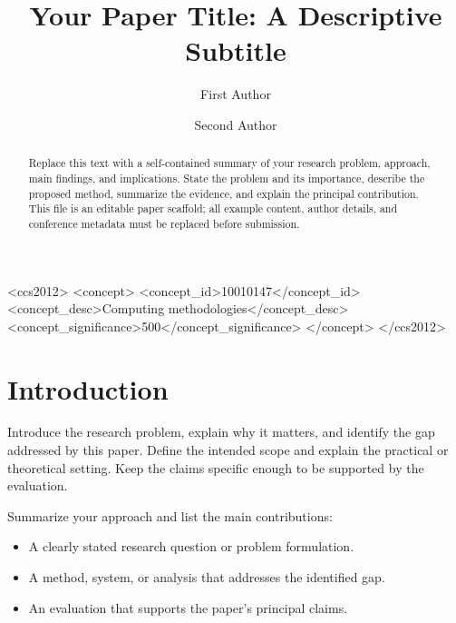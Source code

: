 \documentclass[sigconf]{acmart}
\begin{document}
\title[Short Paper Title]{Your Paper Title: A Descriptive Subtitle}

\author{First Author}

\author{Second Author}

\renewcommand{\shortauthors}{First Author and Second Author}

\begin{abstract}
Replace this text with a self-contained summary of your research problem,
approach, main findings, and implications. State the problem and its importance,
describe the proposed method, summarize the evidence, and explain the principal
contribution. This file is an editable paper scaffold; all example content,
author details, and conference metadata must be replaced before submission.
\end{abstract}

\begin{CCSXML}
<ccs2012>
 <concept>
  <concept_id>10010147</concept_id>
  <concept_desc>Computing methodologies</concept_desc>
  <concept_significance>500</concept_significance>
 </concept>
</ccs2012>
\end{CCSXML}

\maketitle

\section{Introduction}
Introduce the research problem, explain why it matters, and identify the gap
addressed by this paper. Define the intended scope and explain the practical or
theoretical setting. Keep the claims specific enough to be supported by the
evaluation.

Summarize your approach and list the main contributions:
\begin{itemize}
  \item A clearly stated research question or problem formulation.
  \item A method, system, or analysis that addresses the identified gap.
  \item An evaluation that supports the paper's principal claims.
\end{itemize}
\end{document}
